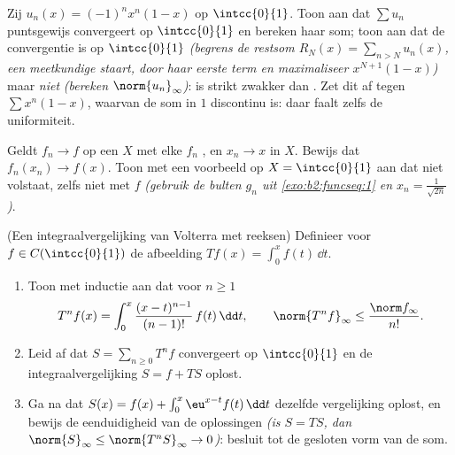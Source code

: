 \begin{exercise}[$\star$]\label{exo:b2:funcseq:10}
Zij $u_n(x) = (-1)^n x^n(1 - x)$ op $\intcc{0}{1}$. Toon aan dat
$\sum u_n$ puntsgewijs convergeert op $\intcc{0}{1}$ en bereken
haar som; toon aan dat de convergentie  is op
$\intcc{0}{1}$ \emph{(begrens de restsom $R_N(x) = \sum_{n > N}
u_n(x)$, een meetkundige staart, door haar eerste term en
maximaliseer $x^{N+1}(1-x)$)} maar \emph{niet} 
\emph{(bereken $\norm{u_n}_\infty$)}:  is
strikt zwakker dan . Zet dit af tegen $\sum
x^n(1-x)$, waarvan de som in $1$ discontinu is: daar faalt zelfs de
uniformiteit.
\end{exercise}

\begin{exercise}[$\star\star$]\label{exo:b2:funcseq:11}
Geldt $f_n \to f$  op een  $X$ met elke
$f_n$ , en $x_n \to x$ in $X$. Bewijs dat $f_n(x_n) \to
f(x)$. Toon met een voorbeeld op $X = \intcc{0}{1}$ aan dat
 niet volstaat, zelfs niet met $f$ 
\emph{(gebruik de bulten $g_n$ uit \cref{exo:b2:funcseq:1} en $x_n
= \frac{1}{\sqrt{2n}}$)}.
\end{exercise}

\begin{exercise}[$\star\star\star$]\label{exo:b2:funcseq:12}
(Een integraalvergelijking van Volterra met reeksen) Definieer voor
$f \in C(\intcc{0}{1})$ de afbeelding $Tf(x) = \int_0^x f(t)\,\dd
t$.
\begin{enumerate}
  \item Toon met inductie aan dat voor $n \geq 1$
        \[
        T^n f(x) = \int_0^x \frac{(x -
        t)^{n-1}}{(n-1)!}\,f(t)\,\dd t,
        \qquad
        \norm{T^n f}_\infty \leq \frac{\norm f_\infty}{n!} .
        \]
  \item Leid af dat $S = \sum_{n\geq0} T^n f$  convergeert
        op $\intcc{0}{1}$ en de integraalvergelijking $S = f + TS$
        oplost.
  \item Ga na dat $S(x) = f(x) + \int_0^x \eu^{x-t}f(t)\,\dd t$
        dezelfde vergelijking oplost, en bewijs de eenduidigheid
        van de  oplossingen \emph{(is $S = TS$, dan
        $\norm{S}_\infty \leq \norm{T^nS}_\infty \to 0$)}: besluit
        tot de gesloten vorm van de som.
\end{enumerate}
\end{exercise}

